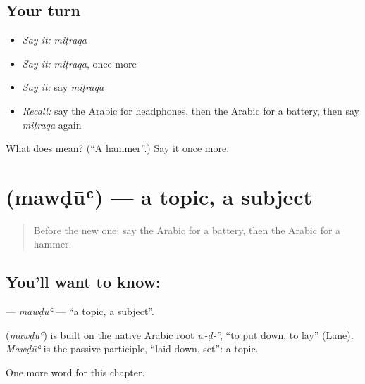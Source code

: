 \subsection*{Your turn}
\begin{itemize}
\raggedright
  \item \emph{Say it:} \emph{miṭraqa}
  \item \emph{Say it:} \emph{miṭraqa}, once more
  \item \emph{Say it:} say \emph{miṭraqa}
  \item \emph{Recall:} say the Arabic for headphones, then the Arabic for a battery, then say \emph{miṭraqa} again
\end{itemize}

\begin{tcolorbox}[breakable,colback=teal!4,colframe=teal!35!black,title={Before you move on}]
What does  mean? (\textquotedblleft{}A hammer\textquotedblright{}.) Say it once more.
\end{tcolorbox}
\section[\texorpdfstring{\ar{موضوع} (mawḍūʿ)}{موضوع (mawḍūʿ)}]{ (mawḍūʿ) — a topic, a subject}

\label{lesson:AR-C218-mawdu}



\begin{quote}
Before the new one: say the Arabic for a battery, then the Arabic for a hammer.
\end{quote}

\subsection*{You'll want to know: }
\textbf{} — \emph{mawḍūʿ} — \textquotedblleft{}a topic, a subject\textquotedblright{}.

\begin{cousinweb}
\textbf{} (\emph{mawḍūʿ}) is built on the native Arabic root \emph{w-ḍ-ʿ}, \textquotedblleft{}to put down, to lay\textquotedblright{} (Lane). \emph{Mawḍūʿ} is the passive participle, \textquotedblleft{}laid down, set\textquotedblright{}: a topic.
\end{cousinweb}

\begin{grammarlens}[title={What you've built}]
One more word for this chapter.
\end{grammarlens}

